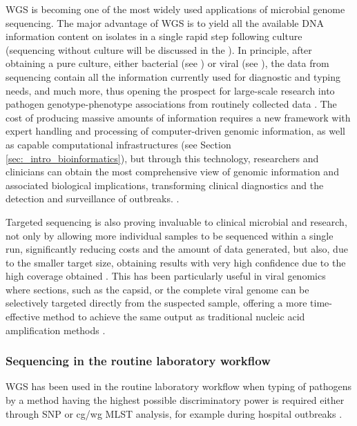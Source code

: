 \ac{WGS} is becoming one of the most widely used applications of microbial genome sequencing. 
The major advantage of \ac{WGS} is to yield all the available DNA information content on isolates in a single rapid step following culture (sequencing without culture will be discussed in the ). 
In principle, after obtaining a pure culture, either bacterial (see ) or viral (see ), the data from sequencing contain all the information currently used for diagnostic and typing needs, and much more, thus opening the prospect for large-scale research into pathogen genotype-phenotype associations from routinely collected data \citep{didelot_transforming_2012}.
The cost of producing massive amounts of information requires a new framework with expert handling and processing of computer-driven genomic information, as well as capable computational infrastructures (see Section \ref{sec:_intro_bioinformatics}), but through this technology, researchers and clinicians can obtain the most comprehensive view of genomic information and associated biological implications, transforming clinical diagnostics and the detection and surveillance of outbreaks. \citep{cirulli_uncovering_2010, nature_reviews_genetics_genomic_2019, goodwin_coming_2016}.

Targeted sequencing is also proving invaluable to clinical microbial and research, not only by allowing more individual samples to be sequenced within a single run, significantly reducing costs and the amount of data generated, but also, due to the smaller target size, obtaining results with very high confidence due to the high coverage obtained \citep{goodwin_coming_2016}.
This has been particularly useful in viral genomics where sections, such as the capsid, or the complete viral genome can be selectively targeted directly from the suspected sample, offering a more time-effective method to achieve the same output as traditional nucleic acid amplification methods \citep{cassedy_virus_2021}. 

\subsubsection{Sequencing in the routine laboratory workflow} \label{sssec:_intro_sequencing_routine_lab}

\ac{WGS} has been used in the routine laboratory workflow when typing of pathogens by a method having the highest possible discriminatory power is required either through \ac{SNP} or \ac{cg/wg MLST} analysis, for example during hospital outbreaks \citep{tagini_bacterial_2017}. 

